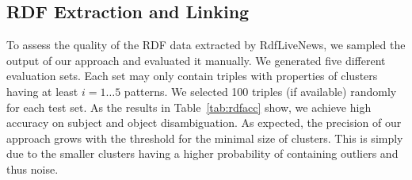 \documentclass[a4paper]{llncs}
\newcommand{\NAME}{RdfLiveNews}
\begin{document}
\subsection{RDF Extraction and Linking}
To assess the quality of the RDF data extracted by \NAME{}, we sampled the output of our approach and evaluated it manually.
We generated five different evaluation sets.
Each set may only contain triples with properties of clusters having at least $i = 1 \dots 5$ patterns.
We selected 100 triples (if available) randomly for each test set.
As the results in Table~\ref{tab:rdfacc} show, we achieve high accuracy on subject and object disambiguation.
As expected, the precision of our approach grows with the threshold for the minimal size of clusters.
This is simply due to the smaller clusters having a higher probability of containing outliers and thus noise.
\end{document}
